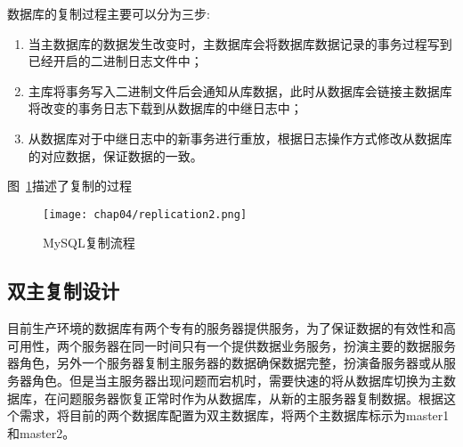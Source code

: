 数据库的复制过程主要可以分为三步:
\begin{enumerate}
\item 当主数据库的数据发生改变时，主数据库会将数据库数据记录的事务过程写到已经开启的二进制日志文件中；
\item 主库将事务写入二进制文件后会通知从库数据，此时从数据库会链接主数据库将改变的事务日志下载到从数据库的中继日志中；
\item 从数据库对于中继日志中的新事务进行重放，根据日志操作方式修改从数据库的对应数据，保证数据的一致\cite{秦金2013分布式}。
\end{enumerate}
图~\ref{fig:replication2}描述了复制的过程
\begin{figure}[H] %
  \centering
  \texttt{[image: chap04/replication2.png]}
  \caption{MySQL复制流程}
  \label{fig:replication2}
\end{figure}




\subsection{双主复制设计}
目前生产环境的数据库有两个专有的服务器提供服务，为了保证数据的有效性和高可用性，两个服务器在同一时间只有一个提供数据业务服务，扮演主要的数据服务器角色，另外一个服务器复制主服务器的数据确保数据完整，扮演备服务器或从服务器角色。但是当主服务器出现问题而宕机时，需要快速的将从数据库切换为主数据库，在问题服务器恢复正常时作为从数据库，从新的主服务器复制数据。根据这个需求，将目前的两个数据库配置为双主数据库，将两个主数据库标示为master1和master2。

